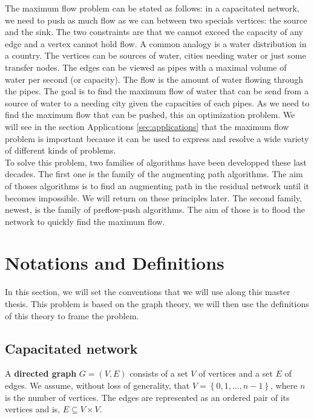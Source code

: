 The maximum flow problem can be stated as follows: in a capacitated network, we need to push as much flow as we can between two specials vertices: the source and the sink. The two constraints are that we cannot exceed the capacity of any edge and a vertex cannot hold flow. A common analogy is a water distribution in a country. The vertices can be sources of water, cities needing water or just some transfer nodes. The edges can be viewed as pipes with a maximal volume of water per second (or capacity). The flow is the amount of water flowing through the pipes. The goal is to find the maximum flow of water that can be send from a source of water to a needing city given the capacities of each pipes. As we need to find the maximum flow that can be pushed, this an optimization problem. We will see in the section Applications \ref{sec:applications} that the maximum flow problem is important because it can be used to express and resolve a wide variety of different kinds of problems.\\

To solve this problem, two families of algorithms have been developped these last decades. The first one is the family of the augmenting path algorithms. The aim of thoses algorithms is to find an augmenting path in the residual network until it becomes impossible. We will return on these principles later. The second family, newest, is the family of preflow-push algorithms. The aim of those is to flood the network to quickly find the maximum flow. \\


\section{Notations and Definitions}

In this section, we will set the conventions that we will use along this master thesis. This problem is based on the graph theory, we will then use the definitions of this theory to frame the problem.

\subsection{Capacitated network}
\begin{definition}
\label{dgraph}
A \textbf{directed graph} $G = (V, E)$ consists of a set $V$ of vertices and a set $E$ of edges. We assume, without loss of generality, that $V = \left\{0, 1, ..., n-1\right\}$, where $n$ is the number of vertices. The edges are represented as an ordered pair of its vertices and is, $E \subseteq V \times V$.
\end{definition}

